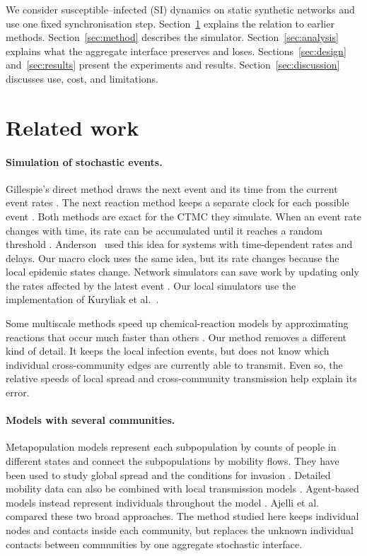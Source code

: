 \documentclass{ieeeaccess}
\begin{document}
We consider susceptible--infected (SI) dynamics on static synthetic networks and use one fixed synchronisation step. Section~\ref{sec:related} explains the relation to earlier methods. Section~\ref{sec:method} describes the simulator. Section~\ref{sec:analysis} explains what the aggregate interface preserves and loses. Sections~\ref{sec:design} and~\ref{sec:results} present the experiments and results. Section~\ref{sec:discussion} discusses use, cost, and limitations.

\section{Related work}
\label{sec:related}

\paragraph{Simulation of stochastic events.}
Gillespie's direct method draws the next event and its time from the current event rates \cite{gillespie1977exact}. The next reaction method keeps a separate clock for each possible event \cite{gibson2000}. Both methods are exact for the CTMC they simulate. When an event rate changes with time, its rate can be accumulated until it reaches a random threshold \cite{ethier1986}. Anderson~\cite{anderson2007} used this idea for systems with time-dependent rates and delays. Our macro clock uses the same idea, but its rate changes because the local epidemic states change. Network simulators can save work by updating only the rates affected by the latest event \cite{vestergaard2015,kuryliak2025simulating}. Our local simulators use the implementation of Kuryliak et al.~\cite{kuryliak2025simulating}.

Some multiscale methods speed up chemical-reaction models by approximating reactions that occur much faster than others \cite{haseltine2002,cao2005slow}. Our method removes a different kind of detail. It keeps the local infection events, but does not know which individual cross-community edges are currently able to transmit. Even so, the relative speeds of local spread and cross-community transmission help explain its error.

\paragraph{Models with several communities.}
Metapopulation models represent each subpopulation by counts of people in different states and connect the subpopulations by mobility flows. They have been used to study global spread and the conditions for invasion \cite{colizza2007reaction,colizza2008,balcan2009,balcan2010modeling}. Detailed mobility data can also be combined with local transmission models \cite{chang2021}. Agent-based models instead represent individuals throughout the model \cite{eubank2004,kerr2021}. Ajelli et al.~\cite{ajelli2010} compared these two broad approaches. The method studied here keeps individual nodes and contacts inside each community, but replaces the unknown individual contacts between communities by one aggregate stochastic interface.
\end{document}
